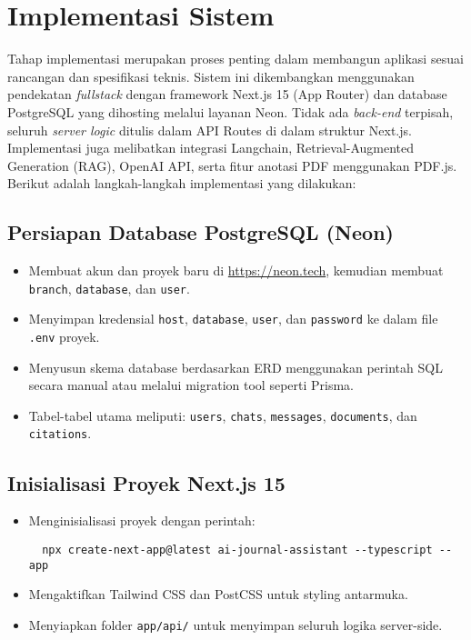 \section{Implementasi Sistem}

Tahap implementasi merupakan proses penting dalam membangun aplikasi sesuai rancangan dan spesifikasi teknis. Sistem ini dikembangkan menggunakan pendekatan \textit{fullstack} dengan framework Next.js 15 (App Router) dan database PostgreSQL yang dihosting melalui layanan Neon. Tidak ada \textit{back-end} terpisah, seluruh \textit{server logic} ditulis dalam API Routes di dalam struktur Next.js. Implementasi juga melibatkan integrasi Langchain, Retrieval-Augmented Generation (RAG), OpenAI API, serta fitur anotasi PDF menggunakan PDF.js. Berikut adalah langkah-langkah implementasi yang dilakukan:

\subsection{Persiapan Database PostgreSQL (Neon)}

\begin{itemize}
  \item Membuat akun dan proyek baru di \url{https://neon.tech}, kemudian membuat \texttt{branch}, \texttt{database}, dan \texttt{user}.
  \item Menyimpan kredensial \texttt{host}, \texttt{database}, \texttt{user}, dan \texttt{password} ke dalam file \texttt{.env} proyek.
  \item Menyusun skema database berdasarkan ERD menggunakan perintah SQL secara manual atau melalui migration tool seperti Prisma.
  \item Tabel-tabel utama meliputi: \texttt{users}, \texttt{chats}, \texttt{messages}, \texttt{documents}, dan \texttt{citations}.
\end{itemize}

\subsection{Inisialisasi Proyek Next.js 15}

\begin{itemize}
  \item Menginisialisasi proyek dengan perintah:
  \begin{verbatim}
  npx create-next-app@latest ai-journal-assistant --typescript --app
  \end{verbatim}
  \item Mengaktifkan Tailwind CSS dan PostCSS untuk styling antarmuka.
  \item Menyiapkan folder \texttt{app/api/} untuk menyimpan seluruh logika server-side.
\end{itemize}

